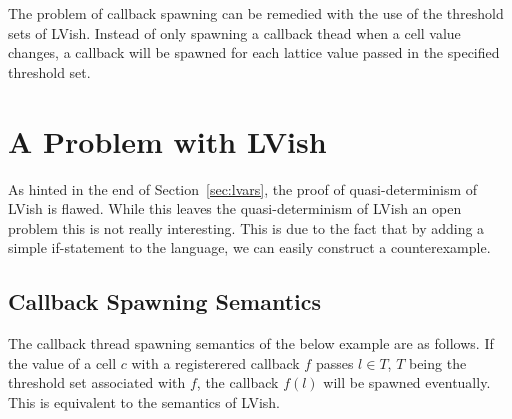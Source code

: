 The problem of callback spawning can be remedied with the use of the threshold
sets of LVish. Instead of only spawning a callback thead when a cell value
changes, a callback will be spawned for each lattice value passed in the
specified threshold set.



\section{A Problem with LVish}%
\label{sec:a_problem_of_lvish}

As hinted in the end of Section~\ref{sec:lvars}, the proof of quasi-determinism
of LVish is flawed. While this leaves the quasi-determinism of LVish an open
problem this is not really interesting. This is due to the fact that by adding a
simple if-statement to the language, we can easily construct a counterexample.

\subsection{Callback Spawning Semantics}%
\label{sub:callback_spawning_semantics_lvish}

The callback thread spawning semantics of the below example are as follows. If
the value of a cell $c$ with a registerered callback $f$ passes $l \in T$, $T$
being the threshold set associated with $f$, the callback $f(l)$ will be spawned
eventually. This is equivalent to the semantics of LVish.


